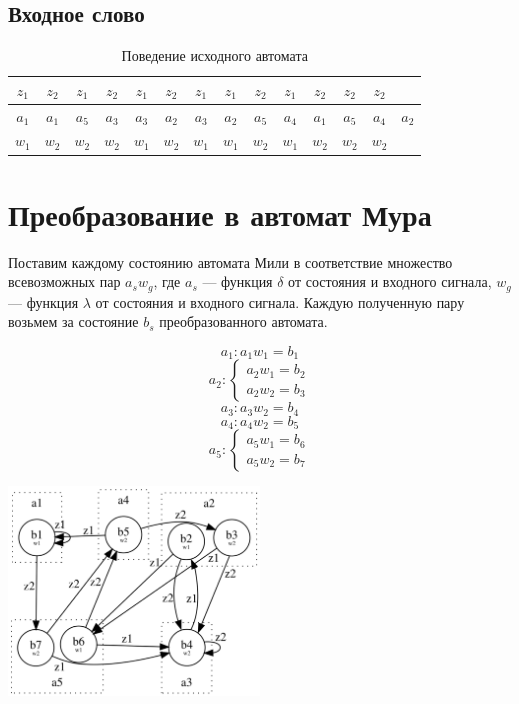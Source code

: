 \documentclass[listings]{labreport}
\begin{document}
\subsection*{Входное слово}

\begin{table}[h]
\begin{tabular}{|c|c|c|c|c|c|c|c|c|c|c|c|c|c|}
\hline
$z_1$ & $z_2$ & $z_1$ & $z_2$ & $z_1$ & $z_2$ & $z_1$ & $z_1$ & $z_2$ & $z_1$ & $z_2$ & $z_2$ & $z_2$ & \\\hline

$a_1$ & $a_1$ & $a_5$ & $a_3$ & $a_3$ & $a_2$ & $a_3$ & $a_2$ & $a_5$ & $a_4$ & $a_1$ & $a_5$ & $a_4$ & $a_2$ \\\hline

$w_1$ & $w_2$ & $w_2$ & $w_2$ & $w_1$ & $w_2$ & $w_1$ & $w_1$ & $w_2$ & $w_1$ & $w_2$ & $w_2$ & $w_2$ & \\\hline
\end{tabular}
\caption{Поведение исходного автомата}
\end{table}

\section*{Преобразование в автомат Мура}

Поставим каждому состоянию автомата Мили в соответствие множество всевозможных
пар $a_s w_g$, где $a_s$ — функция $\delta$ от состояния и входного сигнала,
$w_g$ — функция $\lambda$ от состояния и входного сигнала.
Каждую полученную пару возьмем за состояние $b_s$ преобразованного автомата.

$$a_1: a_1w_1 = b_1$$
$$a_2:
\begin{cases}
a_2w_1 = b_2 \\
a_2w_2 = b_3
\end{cases}$$
$$a_3: a_3w_2 = b_4$$
$$a_4: a_4w_2 = b_5$$
$$a_5:
\begin{cases}
a_5w_1 = b_6 \\
a_5w_2 = b_7
\end{cases}$$

\includegraphics[width=0.5\textwidth]{moore.png}
\end{document}
